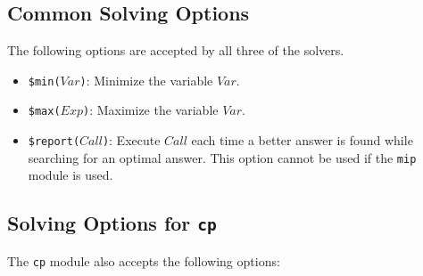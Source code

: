 \subsection{Common Solving Options}
The following options are accepted by all three of the solvers.
\begin{itemize}
\item \texttt{\$min($Var$)}: Minimize the variable $Var$.
\item \texttt{\$max($Exp$)}: Maximize the variable $Var$.
\item \texttt{\$report($Call$)}: Execute $Call$ each time a better answer is found while searching for an optimal answer. This option cannot be used if the {\tt mip} module is used.
\end{itemize}

\subsection{Solving Options for \texttt{cp}}
The \texttt{cp} module also accepts the following options:
